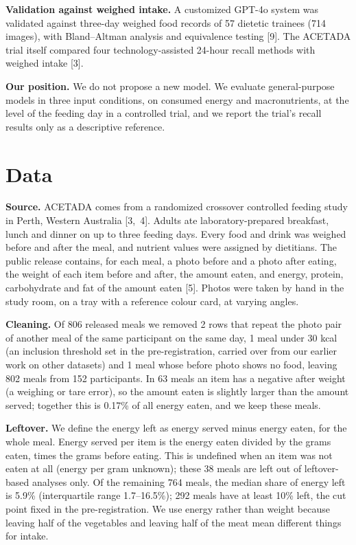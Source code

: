 \documentclass[
  11pt,
  letterpaper]{article}
\begin{document}
\textbf{Validation against weighed intake.} A customized GPT-4o system was validated against three-day weighed
food records of 57 dietetic trainees (714 images), with Bland--Altman analysis and equivalence testing
{[}9{]}. The ACETADA trial itself compared four technology-assisted 24-hour recall methods with weighed intake
{[}3{]}.

\textbf{Our position.} We do not propose a new model. We evaluate general-purpose models in three input
conditions, on consumed energy and macronutrients, at the level of the feeding day in a controlled trial, and
we report the trial's recall results only as a descriptive reference.

\section{Data}\label{data}

\textbf{Source.} ACETADA comes from a randomized crossover controlled feeding study in Perth, Western
Australia {[}3,~4{]}. Adults ate laboratory-prepared breakfast, lunch and dinner on up to three feeding days.
Every food and drink was weighed before and after the meal, and nutrient values were assigned by dietitians.
The public release contains, for each meal, a photo before and a photo after eating, the weight of each item
before and after, the amount eaten, and energy, protein, carbohydrate and fat of the amount eaten {[}5{]}.
Photos were taken by hand in the study room, on a tray with a reference colour card, at varying angles.

\textbf{Cleaning.} Of 806 released meals we removed 2 rows that repeat the photo pair of another meal of the
same participant on the same day, 1 meal under 30 kcal (an inclusion threshold set in the pre-registration,
carried over from our earlier work on other datasets) and 1 meal whose before photo shows no food, leaving 802
meals from 152 participants. In 63 meals an item has a negative after weight (a weighing or tare error), so
the amount eaten is slightly larger than the amount served; together this is 0.17\% of all energy eaten, and
we keep these meals.

\textbf{Leftover.} We define the energy left as energy served minus energy eaten, for the whole meal. Energy
served per item is the energy eaten divided by the grams eaten, times the grams before eating. This is
undefined when an item was not eaten at all (energy per gram unknown); these 38 meals are left out of
leftover-based analyses only. Of the remaining 764 meals, the median share of energy left is 5.9\%
(interquartile range 1.7--16.5\%); 292 meals have at least 10\% left, the cut point fixed in the
pre-registration. We use energy rather than weight because leaving half of the vegetables and leaving half of
the meat mean different things for intake.
\end{document}
